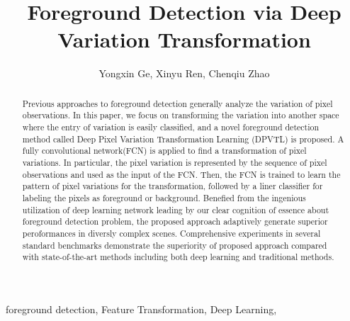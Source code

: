 \documentclass[journal]{IEEEtran}
\begin{document}
\title{Foreground Detection via Deep Variation Transformation}

\author{Yongxin Ge, 
        Xinyu Ren, 
        Chenqiu Zhao}




\maketitle



\begin{abstract}
%
Previous approaches to foreground detection generally analyze the variation of pixel observations.
In this paper, we focus on transforming the variation into another space where the entry of variation is easily classified, and a novel foreground detection method called Deep Pixel Variation Transformation Learning (DPVTL) is proposed.
A fully convolutional network(FCN) is applied to find a transformation of pixel variations.
In particular,
the pixel variation is represented by the sequence of pixel observations and used as the input of the FCN.
Then, the FCN is trained to learn the pattern of pixel variations for the transformation, followed by a liner classifier for labeling the pixels as foreground or background.
%    
Benefied from the ingenious utilization of deep learning network leading by our clear cognition of essence about foreground detection problem,
the proposed approach adaptively generate superior peroformances in diversly complex scenes.
%
Comprehensive experiments in several standard benchmarks demonstrate the superiority of proposed approach compared with state-of-the-art methods including both deep learning and traditional methods.
%
\end{abstract}

\begin{IEEEkeywords} 
    foreground detection, Feature Transformation, Deep Learning,
\end{IEEEkeywords}
\end{document}
